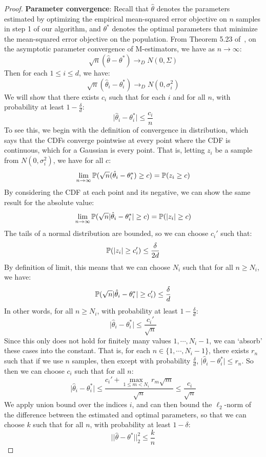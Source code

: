 \begin{proof}
\textbf{Parameter convergence}: Recall that $\hat{\theta}$ denotes the parameters estimated by optimizing the empirical mean-squared error objective on $n$ samples in step 1 of our algorithm, and $\theta^*$ denotes the optimal parameters that minimize the mean-squared error objective on the population. From Theorem 5.23 of~\cite{vaart98asymptotic}, on the asymptotic parameter convergence of M-estimators, we have as $n \to \infty$:
\[ \sqrt{n}(\hat{\theta} - \theta^*) \to_D N(0, \Sigma) \]
Then for each $1 \leq i \leq d$, we have:
\[ \sqrt{n}(\hat{\theta}_i - \theta^*_i) \to_D N(0, \sigma_i^2) \]
We will show that there exists $c_i$ such that for each $i$ and for all $n$, with probability at least $1 - \frac{\delta}{d}$:
\[ \lvert \hat{\theta}_i - \theta^*_i \rvert \leq \frac{c_i}{n} \]
To see this, we begin with the definition of convergence in distribution, which says that the CDFs converge pointwise at every point where the CDF is continuous, which for a Gaussian is every point. That is, letting $z_i$ be a sample from $N(0, \sigma_i^2)$, we have for all $c$:
\[ \lim_{n \to \infty} \mathbb{P}( \sqrt{n}(\hat{\theta}_i - \theta^*_i) \geq c) = \mathbb{P}(z_i \geq c) \]
By considering the CDF at each point and its negative, we can show the same result for the absolute value:
\[ \lim_{n \to \infty} \mathbb{P}( \sqrt{n} \lvert \hat{\theta}_i - \theta^*_i \rvert \geq c) = \mathbb{P}(\lvert z_i \rvert \geq c) \]
The tails of a normal distribution are bounded, so we can choose $c_i'$ such that:
\[ \mathbb{P}(\lvert z_i \rvert \geq c_i') \leq \frac{\delta}{2d} \]
By definition of limit, this means that we can choose $N_i$ such that for all $n \geq N_i$, we have:
\[ \mathbb{P}( \sqrt{n} \lvert \hat{\theta}_i - \theta^*_i \rvert \geq c_i') \leq \frac{\delta}{d} \]
In other words, for all $n \geq N_i$, with probability at least $1 - \frac{\delta}{d}$:
\[ \lvert \hat{\theta}_i - \theta^*_i \rvert \leq \frac{c_i'}{\sqrt{n}} \]
Since this only does not hold for finitely many values $1, \cdots, N_i - 1$, we can `absorb' these cases into the constant. That is, for each $n \in \{1, \cdots, N_i - 1 \}$, there exists $r_n$ such that if we use $n$ samples, then except with probability $\frac{\delta}{d}$, $\lvert \hat{\theta}_i - \theta^*_i \rvert \leq r_n$. So then we can choose $c_i$ such that for all $n$:
\[ \lvert \hat{\theta}_i - \theta^*_i \rvert \leq \frac{c_i' + \max_{1 \leq m < N_i}{r_m \sqrt{m}}}{\sqrt{n}} \leq \frac{c_i}{\sqrt{n}} \]
We apply union bound over the indices $i$, and can then bound the $\ell_2$-norm of the difference between the estimated and optimal parameters, so that we can choose $k$ such that for all $n$, with probability at least $1 - \delta$:
\[ ||\hat{\theta} - \theta^*||_2^2 \leq \frac{k}{n} \]


\end{proof}

